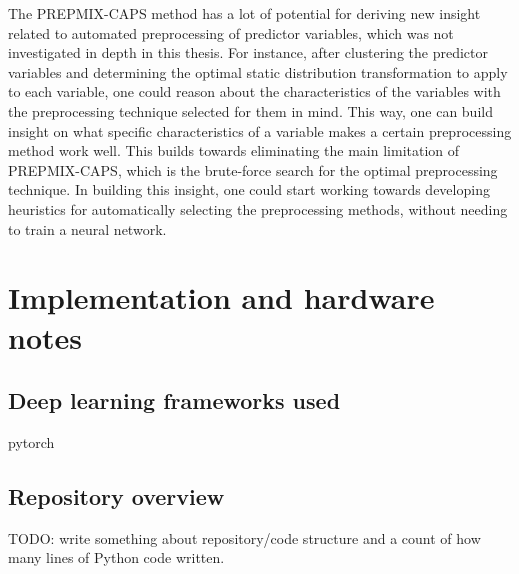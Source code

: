 \documentclass{statsmsc}
\begin{document}
{%
The \ac{PREPMIX-CAPS} method has a lot of potential for deriving new insight
related to automated preprocessing of predictor variables, which was not
investigated in depth in this thesis. For instance, after clustering the
predictor variables and determining the optimal static distribution
transformation to apply to each variable, one could reason about the characteristics
of the variables with the preprocessing technique selected for
them in mind. This way, one can build insight on what specific characteristics of a
variable makes a certain preprocessing method work well.
This builds towards eliminating the main limitation of \ac{PREPMIX-CAPS}, which
is the brute-force search for the optimal preprocessing technique. In building
this insight, one could start working towards developing heuristics for
automatically selecting the preprocessing methods, without needing to train a
neural network.


\clearpage
\renewcommand*{\thepage}{A\arabic{page}}

\appendix

\chapter{Implementation and hardware notes}%
\label{cha:Implementation notes}

\section{Deep learning frameworks used}%
\label{sec:Deep learning frameworks used}

pytorch

\section{Repository overview}%
\label{sec:Repository overview}

TODO: write something about repository/code structure and a count of how many lines
of Python code written.

}
\end{document}
